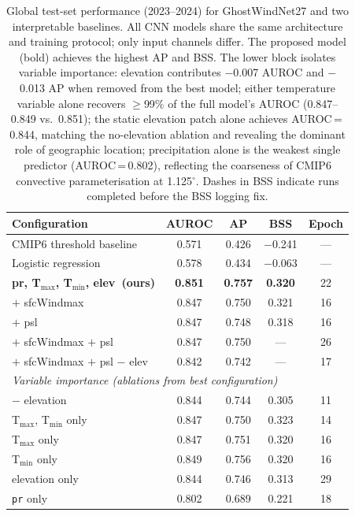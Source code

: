 \documentclass{article}
\begin{document}
\begin{table}[t]
    \centering
    \captionsetup{justification=centering}
    \setlength{\tabcolsep}{4pt}
    \begin{tabular}{lcccc}
         \toprule
         \textbf{Configuration} & \textbf{AUROC} & \textbf{AP} & \textbf{BSS} & \textbf{Epoch} \\
         \midrule
         CMIP6 threshold baseline & 0.571 & 0.426 & $-$0.241 & --- \\
         Logistic regression       & 0.578 & 0.434 & $-$0.063 & --- \\
         \midrule
         \textbf{pr, T$_{\max}$, T$_{\min}$, elev~(ours)} & \textbf{0.851} & \textbf{0.757} & \textbf{0.320} & 22 \\
         \quad $+$ sfcWindmax & 0.847 & 0.750 & 0.321 & 16 \\
         \quad $+$ psl & 0.847 & 0.748 & 0.318 & 16 \\
         \quad $+$ sfcWindmax $+$ psl & 0.847 & 0.750 & --- & 26 \\
         \quad $+$ sfcWindmax $+$ psl $-$ elev & 0.842 & 0.742 & --- & 17 \\
         \midrule
         \multicolumn{5}{l}{\textit{Variable importance (ablations from best configuration)}} \\
         \midrule
         \quad $-$ elevation & 0.844 & 0.744 & 0.305 & 11 \\
         \quad T$_{\max}$, T$_{\min}$ only & 0.847 & 0.750 & 0.323 & 14 \\
         \quad T$_{\max}$ only & 0.847 & 0.751 & 0.320 & 16 \\
         \quad T$_{\min}$ only & 0.849 & 0.756 & 0.320 & 16 \\
         \quad elevation only & 0.844 & 0.746 & 0.313 & 29 \\
         \quad \texttt{pr} only & 0.802 & 0.689 & 0.221 & 18 \\
         \bottomrule
    \end{tabular}
    \caption{Global test-set performance (2023--2024) for GhostWindNet27 and two interpretable baselines. All CNN models share the same architecture and training protocol; only input channels differ. The proposed model (bold) achieves the highest AP and BSS. The lower block isolates variable importance: elevation contributes $-$0.007 AUROC and $-$0.013 AP when removed from the best model; either temperature variable alone recovers $\geq$99\% of the full model's AUROC (0.847--0.849 vs.\ 0.851); the static elevation patch alone achieves AUROC\,=\,0.844, matching the no-elevation ablation and revealing the dominant role of geographic location; precipitation alone is the weakest single predictor (AUROC\,=\,0.802), reflecting the coarseness of CMIP6 convective parameterisation at 1.125$^\circ$. Dashes in BSS indicate runs completed before the BSS logging fix.}
    \label{tab:metrics}
\end{table}
\end{document}
